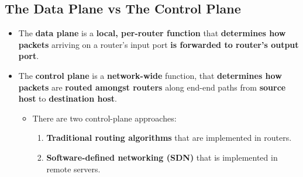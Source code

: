\documentclass{article}
\begin{document}
    \subsection*{The Data Plane vs The Control Plane}
    \begin{itemize}
        \item The \textbf{data plane} is a \textbf{local, per-router function} that \textbf{determines how packets} arriving on a router's input port \textbf{is forwarded to router's output port}.
        \item The \textbf{control plane} is a \textbf{network-wide} function, that \textbf{determines how packets} are \textbf{routed amongst routers} along end-end paths from \textbf{source host} to \textbf{destination host}.
        \begin{itemize}
            \item There are two control-plane approaches:
            \begin{enumerate}
                \item \textbf{Traditional routing algorithms} that are implemented in routers.
                \item \textbf{Software-defined networking (SDN)} that is implemented in remote servers.
            \end{enumerate}
        \end{itemize}
    \end{itemize}
\end{document}
